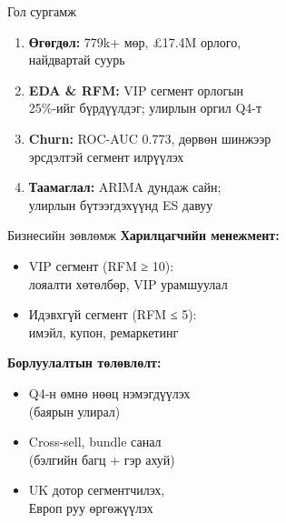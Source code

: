 \documentclass{beamer}
\begin{document}
\begin{frame}{Гол сургамж}
\small
\begin{enumerate}
    \item \textbf{Өгөгдөл:} 779k+ мөр, £17.4M орлого,\\найдвартай суурь
    \item \textbf{EDA \& RFM:} VIP сегмент орлогын\\25\%-ийг бүрдүүлдэг; улирлын оргил Q4-т
    \item \textbf{Churn:} ROC-AUC 0.773, дөрвөн шинжээр\\эрсдэлтэй сегмент илрүүлэх
    \item \textbf{Таамаглал:} ARIMA дундаж сайн;\\улирлын бүтээгдэхүүнд ES давуу
\end{enumerate}
\end{frame}

\begin{frame}{Бизнесийн зөвлөмж}
\small
\textbf{Харилцагчийн менежмент:}
\begin{itemize}
    \item VIP сегмент (RFM ≥ 10):\\лояалти хөтөлбөр, VIP урамшуулал
    \item Идэвхгүй сегмент (RFM ≤ 5):\\имэйл, купон, ремаркетинг
\end{itemize}

\vspace{0.2cm}
\textbf{Борлуулалтын төлөвлөлт:}
\begin{itemize}
    \item Q4-н өмнө нөөц нэмэгдүүлэх\\(баярын улирал)
    \item Cross-sell, bundle санал\\(бэлгийн багц + гэр ахуй)
    \item UK дотор сегментчилэх,\\Европ руу өргөжүүлэх
\end{itemize}
\end{frame}
\end{document}
